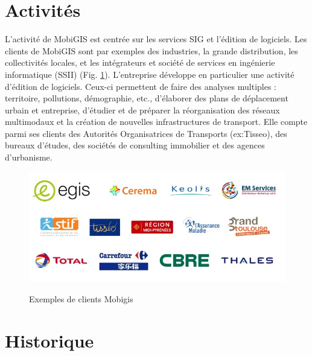 \pagebreak

\section{Activités}

L'activité de MobiGIS est centrée sur les services SIG et l'édition de logiciels. Les clients de MobiGIS sont par exemples des industries, la grande distribution, les collectivités locales, et les intégrateurs et société de services en ingénierie informatique (SSII) (Fig. \ref{ClientsMobigis}). L’entreprise développe en particulier une activité d’édition de logiciels. Ceux-ci permettent de faire des analyses multiples : territoire, pollutions, démographie, etc., d’élaborer des plans de déplacement urbain et entreprise, d’étudier et de préparer la réorganisation des réseaux multimodaux et la création de nouvelles infrastructures de transport. Elle compte parmi ses clients des Autorités Organisatrices de Transports (ex:Tisseo), des bureaux d’études, des sociétés de consulting immobilier et des agences d’urbanisme.\\

\begin{center}
\begin{figure}[h] \centering
\includegraphics[width=14cm]{images/fig2_referencesMobigis.JPG}\\
\caption{\label{ClientsMobigis} Exemples de clients Mobigis}
\end{figure}
\end{center}

\section{Historique}

